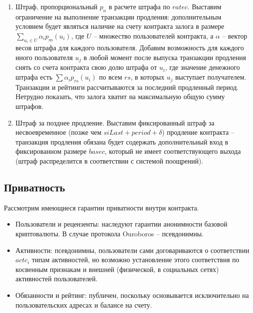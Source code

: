 \documentclass[specification,annotation]{itmo-student-thesis}
\begin{document}
\begin{enumerate}
  \item Штраф, пропорциональный $p_n$ в расчете штрафа по
    $ratec$. Выставим ограничение на выполнение транзакции продления:
    дополнительным условием будет являться наличие на счету контракта
    залога в размере $\sum_{u_i \in U}{\alpha_i p_m(u_i)}$, где $U$ --
    множество пользователей контракта, а $\alpha$ -- вектор весов
    штрафа для каждого пользователя. Добавим возможность для каждого
    иного пользователя $u_j$ в любой момент после выпуска транзакции
    продления снять со счета контракта свою долю штрафа от $u_i$, где
    значение денежного штрафа есть $\sum{\alpha_i p_{rs}(u_i)}$ по
    всем $rs$, в которых $u_j$ выступает получателем. Транзакции и
    рейтинги рассчитываются за последний продленный период. Нетрудно
    показать, что залога хватит на максимальную общую сумму штрафов.
  \item Штраф за позднее продление. Выставим фиксированный штраф за
    несвоевременное (позже чем $siLast + period + \delta$) продление
    контракта -- транзакция продления обязана будет содержать
    дополнительный вход в фиксированном размере $basec$, который не
    имеет соответствующего выхода (штраф распределится в соответствии
    с системой поощрений).
\end{enumerate}

\subsection{Приватность}

Рассмотрим имеющиеся гарантии приватности внутри контракта.
\begin{itemize}
  \item Пользователи и рецензенты: наследуют гарантии анонимности
    базовой криптовалюты. В случае протокола Ouroboros -- псевдонимны.
  \item Активности: псевдонимны, пользователи сами
    договариваются о соответствии $actc_i$ типам активностей, но
    возможно установление этого соответствия по косвенным признакам и
    внешней (физической, в социальных сетях) активностей
    пользователей.
  \item Обязанности и рейтинг: публичен, поскольку основывается
    исключительно на пользовательских адресах и балансе на счету.
\end{itemize}
\end{document}
